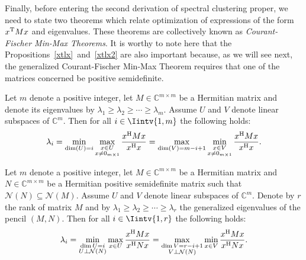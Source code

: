 Finally, before entering the second derivation of spectral clustering proper, we need to state two theorems which relate optimization of expressions of the form $x^{\rm T}Mx$ and eigenvalues.
These theorems are collectively known as \textit{Courant-Fischer Min-Max Theorems}.
   It is worthy to note here that the Propositions~\ref{xtlx}~and~\vref{xtlx2} are also important because, as we will see next, the generalized Courant-Fischer Min-Max Theorem requires that one of the matrices concerned be positive semidefinite. 

\begin{theorem}\label{minmax1}
   Let $m$ denote a positive integer, let $M \in \mathbb{C}^{m \times m}$ be a Hermitian matrix and denote its eigenvalues by $\lambda_1 \ge \lambda_2 \ge \cdots \ge \lambda_m$. 
   Assume $U$ and $V$ denote linear subspaces of $\mathbb C^{m }$.
   Then for all $i \in \Iintv{1,m}$ the following holds:
\begin{equation}
   \lambda_i = \min_{\dim (U) = i} \max_{\substack{x \in U \\ x \ne 0_{m \times 1}}} \frac{x^{\rm H}Mx}{x^{\rm H}x} = \max_{\dim (V) = m-i+1} \min_{\substack{x \in V \\ x \ne 0_{m \times 1}}} \frac{x^{\rm H}Mx}{x^{\rm H}x}.
\end{equation}
\end{theorem}

\begin{theorem} \label{minmax2}
   Let $m$ denote a positive integer, let $M \in \mathbb {C} ^{m \times m}$ be a Hermitian matrix and $N \in \mathbb C ^{m \times m}$ be a Hermitian positive semidefinite matrix such that $\mathcal N (N)  \subseteq \mathcal N (M)$.
   Assume $U$ and $V$ denote linear subspaces of $\mathbb C^{m }$.
   Denote by $r$ the rank of matrix $M$ and by $\lambda_1 \ge \lambda_2 \ge \cdots \ge \lambda_r$ the generalized eigenvalues of the pencil $(M,N)$.
   Then for all $i \in \Iintv{1,r}$ the following holds:
   \begin{equation}
      \lambda_i = \min_{\substack{ \dim U = i \\ U \bot \mathcal N (N)}} \max_{x \in U} \frac{x^{\rm H}Mx}{x^{\rm H}Nx} = \max_{\substack{\dim  V = r - i + 1 \\ V \bot \mathcal N (N)}} \min_{x \in V} \frac{x^{\rm H}Mx}{x^{\rm H}Nx}.
   \end{equation}
\end{theorem}

